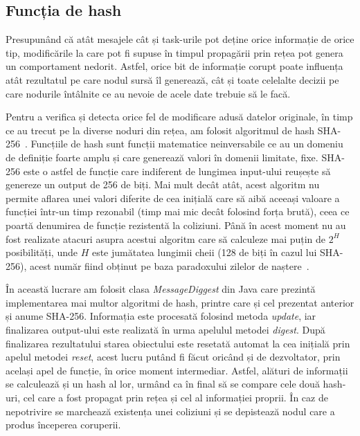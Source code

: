 \documentclass[12pt,a4paper]{report}
\begin{document}
\subsection{Funcția de hash} \label{hash}
Presupunând că atât mesajele cât și task-urile pot deține orice informație de orice tip, modificările la care pot fi supuse în timpul propagării prin rețea pot genera un comportament nedorit. Astfel, orice bit de informație corupt poate influența atât rezultatul pe care nodul sursă îl generează, cât și toate celelalte decizii pe care nodurile întâlnite ce au nevoie de acele date trebuie să le facă.

Pentru a verifica și detecta orice fel de modificare adusă datelor originale, în timp ce au trecut pe la diverse noduri din rețea, am folosit algoritmul de hash SHA-256~\cite{sha256}. Funcțiile de hash sunt funcții matematice neinversabile ce au un domeniu de definiție foarte amplu și care generează valori în domenii limitate, fixe. SHA-256 este o astfel de funcție care indiferent de lungimea input-ului reușește să genereze un output de 256 de biți. Mai mult decât atât, acest algoritm nu permite aflarea unei valori diferite de cea inițială care să aibă aceeași valoare a funcției într-un timp rezonabil (timp mai mic decât folosind forța brută), ceea ce poartă denumirea de funcție rezistentă la coliziuni. Până în acest moment nu au fost realizate atacuri asupra acestui algoritm care să calculeze mai puțin de $2^H$ posibilități, unde $H$ este jumătatea lungimii cheii (128 de biți în cazul lui SHA-256), acest număr fiind obținut pe baza paradoxului zilelor de naștere~\cite{birthdayParadox}. 

În această lucrare am folosit clasa \textit{MessageDiggest} din Java care prezintă implementarea mai multor algoritmi de hash, printre care și cel prezentat anterior și anume SHA-256. Informația este procesată folosind metoda \textit{update}, iar finalizarea output-ului este realizată în urma apelulul metodei \textit{digest}. După finalizarea rezultatului starea obiectului este resetată automat la cea inițială prin apelul metodei \textit{reset}, acest lucru putând fi făcut oricând și de dezvoltator, prin același apel de funcție, în orice moment intermediar. Astfel, alături de informații se calculează și un hash al lor, urmând ca în final să se compare cele două hash-uri, cel care a fost propagat prin rețea și cel al informației proprii. În caz de nepotrivire se marchează existența unei coliziuni și se depistează nodul care a produs începerea coruperii.  
\end{document}
